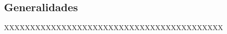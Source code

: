 \subsection{Generalidades} \label{subsection: SPDA-ATT-general}

XXXXXXXXXXXXXXXXXXXXXXXXXXXXXXXXXXXXXXXXXX

%

%

%


